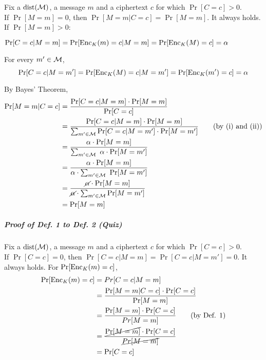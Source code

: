 Fix a \(\operatorname{dist}(\operatorname{\mathcal{M}})\), a message \(m\) and a ciphertext \(c\) for which \(\Pr[C = c] > 0\). \\
If \(\Pr[M = m] = 0\), then \(\Pr[M = m | C = c] = \Pr[M = m]\). It always holds. \\
If \(\Pr[M = m] > 0\):
\begin{myEnumerate}[label=(\roman*)]
	\item \( \Pr[C = c | M = m] = \Pr[\operatorname{Enc}_K(m) = c | M = m] = \Pr[\operatorname{Enc}_K(M) = c] = \mathbf{\alpha} \)
	
	\item For every \(m' \in \operatorname{\mathcal{M}}\),
	\[ \Pr[C = c | M = m'] = \Pr[\operatorname{Enc}_K(M) = c | M = m'] = \Pr[\operatorname{Enc}_K(m') = c] = \mathbf{\alpha} \]
	
	\item By Bayes' Theorem, 
	\begingroup
	\addtolength{\jot}{1em}
	\begin{align*}
		\Pr[M = m | C = c]
				&= \frac{\Pr[C = c | M = m] \cdot \Pr[M = m]}{\Pr[C = c]} \\
				&= \frac{\Pr[C = c | M = m] \cdot \Pr[M = m]}{\sum_{m' \in \operatorname{\mathcal{M}}} \Pr[C = c | M = m'] \cdot \Pr[M = m']} \tag{by (i) and (ii)}\\
				& = \frac{\alpha \cdot \Pr[M = m]}{\sum_{m' \in \operatorname{\mathcal{M}}} \ \alpha \cdot \Pr[M = m']} \\
				& = \frac{\alpha \cdot \Pr[M = m]}{\alpha \cdot \sum_{m' \in \operatorname{\mathcal{M}}} \ \Pr[M = m']} \\
				& = \frac{\cancel\alpha \cdot \Pr[M = m]}{\cancel\alpha \cdot \sum_{m' \in \operatorname{\mathcal{M}}} \Pr[M = m']} \\
				& = \Pr[M = m]
	\end{align*}
	\endgroup
\end{myEnumerate}

\pagebreak

\subparagraph{Proof of Def. 1 to Def. 2 (Quiz)}

Fix a \(\operatorname{dist}(\operatorname{\mathcal{M}})\), a message \(m\) and a ciphertext \(c\) for which \(\Pr[C = c] > 0\). \\
If \(\Pr[C = c] = 0\), then \(\Pr[C = c | M = m] = \Pr[C = c | M = m'] = 0\). It always holds.
For \(\Pr[\operatorname{Enc}_K(m) = c]\),
\begin{align*}
	\Pr[\operatorname{Enc}_K(m) = c] &= Pr[C = c | M = m]\\
	&= \frac{\Pr[M = m | C = c] \cdot \Pr[C = c]}{\Pr[M = m]} \\
	&= \frac{\Pr[M = m] \cdot \Pr[C =c]}{Pr[M = m]} \tag{by Def. 1}\\
	&= \frac{\cancel{\Pr[M = m]} \cdot \Pr[C = c]}{\cancel{Pr[M = m]}} \\
	&= \Pr[C = c]
\end{align*}

